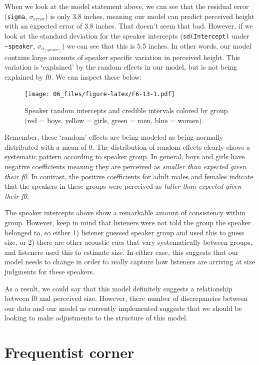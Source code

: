 \documentclass[
]{book}
\begin{document}
When we look at the model statement above, we can see that the residual error (\texttt{sigma}, \(\sigma_{error}\)) is only 3.8 inches, meaning our model can predict perceived height with an expected error of 3.8 inches. That doesn't seem that bad. However, if we look at the standard deviation for the speaker intercepts (\texttt{sd(Intercept)} under \texttt{\textasciitilde{}speaker}, \(\sigma_{\alpha_{[speaker]}}\)) we can see that this is 5.5 inches. In other words, our model contains large amounts of speaker specific variation in perceived height. This variation is `explained' by the random effects in our model, but is not being explained by f0. We can inspect these below:

\begin{figure}
\centering
\texttt{[image: 06\_files/figure-latex/F6-13-1.pdf]}
\caption{\label{fig:F6-13}Speaker random intercepts and credible intervals colored by group (red = boys, yellow = girls, green = men, blue = women).}
\end{figure}

Remember, these `random' effects are being modeled as being normally distributed with a mean of 0. The distribution of random effects clearly shows a systematic pattern according to speaker group. In general, boys and girls have negative coefficients meaning they are perceived as \emph{smaller than expected given their f0}. In contrast, the positive coefficients for adult males and females indicate that the speakers in these groups were perceived as \emph{taller than expected given their f0}.

The speaker intercepts above show a remarkable amount of consistency within group. However, keep in mind that listeners were not told the group the speaker belonged to, so either 1) listener guessed speaker group and used this to guess size, or 2) there are other acoustic cues that vary systematically between groups, and listeners used this to estimate size. In either case, this suggests that our model needs to change in order to really capture how listeners are arriving at size judgments for these speakers.

As a result, we could say that this model definitely suggests a relationship between f0 and perceived size. However, there number of discrepancies between our data and our model as currently implemented suggests that we should be looking to make adjustments to the structure of this model.

\hypertarget{frequentist-corner-3}{%
\section{Frequentist corner}\label{frequentist-corner-3}}
\end{document}
